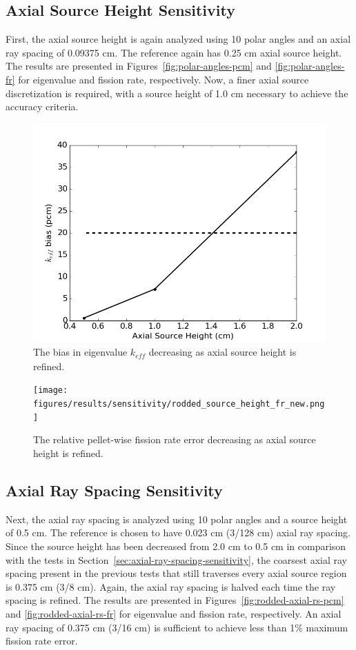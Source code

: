 \subsection{Axial Source Height Sensitivity}

First, the axial source height is again analyzed using 10 polar angles and an axial ray spacing of 0.09375 cm. The reference again has 0.25 cm axial source height. The results are presented in Figures~\ref{fig:polar-angles-pcm} and \ref{fig:polar-angles-fr} for eigenvalue and fission rate, respectively. Now, a finer axial source discretization is required, with a source height of 1.0 cm necessary to achieve the accuracy criteria.

\begin{figure}[h!]
	\centering
	\includegraphics[width=0.7\linewidth]{figures/results/sensitivity/rodded_source_height_pcm.png}
	\caption[]{The bias in eigenvalue $k_{\textit{eff}}$ decreasing as axial source height is refined.}
	\label{fig:rodded-axial-sh-pcm}
\end{figure}
\begin{figure}[h!]
	\centering
	\texttt{[image: figures/results/sensitivity/rodded\_source\_height\_fr\_new.png]}
	\caption[]{The relative pellet-wise fission rate error decreasing as axial source height is refined.}
	\label{fig:rodded-axial-sh-fr}
\end{figure}

\subsection{Axial Ray Spacing Sensitivity}

Next, the axial ray spacing is analyzed using 10 polar angles and a source height of 0.5 cm. The reference is chosen to have 0.023 cm (3/128 cm) axial ray spacing. Since the source height has been decreased from 2.0 cm to 0.5 cm in comparison with the tests in Section~\ref{sec:axial-ray-spacing-sensitivity}, the coarsest axial ray spacing present in the previous tests that still traverses every axial source region is 0.375 cm (3/8 cm). Again, the axial ray spacing is halved each time the ray spacing is refined. The results are presented in Figures~\ref{fig:rodded-axial-rs-pcm} and \ref{fig:rodded-axial-rs-fr} for eigenvalue and fission rate, respectively. An axial ray spacing of 0.375 cm (3/16 cm) is sufficient to achieve less than 1\% maximum fission rate error.

